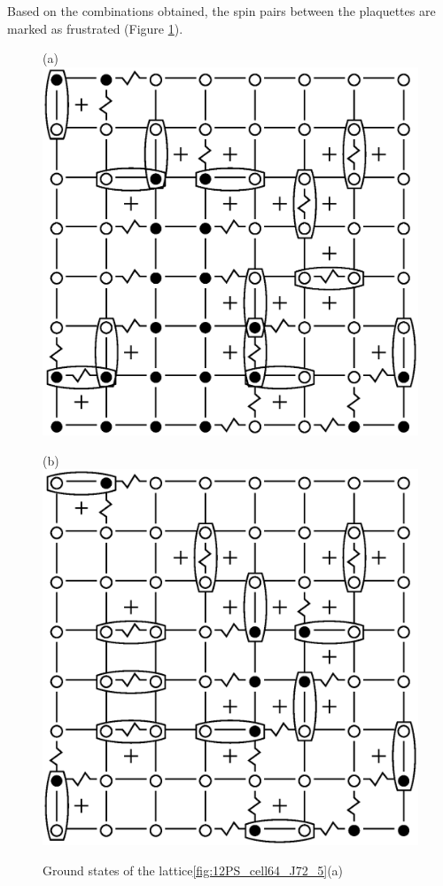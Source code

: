 \documentclass[utf8, babel, sor, jor, amsmath, amssymb, reprint]{elsarticle} %
\begin{document}
Based on the combinations obtained, the spin pairs between the plaquettes are marked as frustrated (Figure \ref{fig:12F_cell64_J72_5}).

\begin{figure}[H]
	\centering
	\begin{minipage}[h]{0.3\linewidth}
		\centering(a)
		\includegraphics[width=1\linewidth]{pictures/1Conf_cell64_J72_5.eps}
	\end{minipage}
	\hspace{15pt}
	\begin{minipage}[h]{0.3\linewidth}
		\centering(b)
		\includegraphics[width=1\linewidth]{pictures/2Conf_cell64_J72_5.eps}
	\end{minipage}
	\caption{Ground states of the lattice\ref{fig:12PS_cell64_J72_5}(a)}
	\label{fig:12F_cell64_J72_5}
\end{figure}
\end{document}
